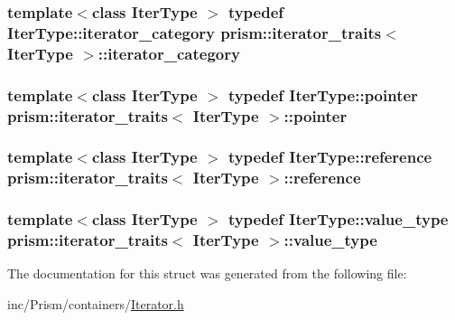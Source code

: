 \subsubsection[{\texorpdfstring{iterator\+\_\+category}{iterator_category}}]{\setlength{\rightskip}{0pt plus 5cm}template$<$class Iter\+Type $>$ typedef Iter\+Type\+::iterator\+\_\+category {\bf prism\+::iterator\+\_\+traits}$<$ Iter\+Type $>$\+::{\bf iterator\+\_\+category}}\hypertarget{structprism_1_1iterator__traits_a2e20906a677a5a465bf343ff4281a010}{}\label{structprism_1_1iterator__traits_a2e20906a677a5a465bf343ff4281a010}
\subsubsection[{\texorpdfstring{pointer}{pointer}}]{\setlength{\rightskip}{0pt plus 5cm}template$<$class Iter\+Type $>$ typedef Iter\+Type\+::pointer {\bf prism\+::iterator\+\_\+traits}$<$ Iter\+Type $>$\+::{\bf pointer}}\hypertarget{structprism_1_1iterator__traits_a5ec4c84886d15b5efa1bb3fd0984dd71}{}\label{structprism_1_1iterator__traits_a5ec4c84886d15b5efa1bb3fd0984dd71}
\subsubsection[{\texorpdfstring{reference}{reference}}]{\setlength{\rightskip}{0pt plus 5cm}template$<$class Iter\+Type $>$ typedef Iter\+Type\+::reference {\bf prism\+::iterator\+\_\+traits}$<$ Iter\+Type $>$\+::{\bf reference}}\hypertarget{structprism_1_1iterator__traits_af4ddc7a938960bb8c558e6eae9ee1548}{}\label{structprism_1_1iterator__traits_af4ddc7a938960bb8c558e6eae9ee1548}
\subsubsection[{\texorpdfstring{value\+\_\+type}{value_type}}]{\setlength{\rightskip}{0pt plus 5cm}template$<$class Iter\+Type $>$ typedef Iter\+Type\+::value\+\_\+type {\bf prism\+::iterator\+\_\+traits}$<$ Iter\+Type $>$\+::{\bf value\+\_\+type}}\hypertarget{structprism_1_1iterator__traits_a764c6740051f048bb81ba63d993e96cd}{}\label{structprism_1_1iterator__traits_a764c6740051f048bb81ba63d993e96cd}


The documentation for this struct was generated from the following file\+:\begin{DoxyCompactItemize}
\item 
inc/\+Prism/containers/\hyperlink{_iterator_8h}{Iterator.\+h}\end{DoxyCompactItemize}
